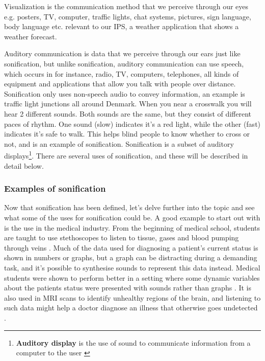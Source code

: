 Visualization is the communication method that we perceive through our eyes e.g. posters, TV, computer, traffic lights, chat systems, pictures, sign language, body language etc. relevant to our IPS, a weather application that shows a weather forecast.


Auditory communication is data that we perceive through our ears just like sonification, but unlike sonification, auditory communication can use speech, which occurs in for instance, radio, TV, computers, telephones, all kinds of equipment and applications that allow you talk with people over distance. 
Sonification only uses non-speech audio to convey information, an example is traffic light junctions all around Denmark. 
When you near a crosswalk you will hear 2 different sounds. 
Both sounds are the same, but they consist of different paces of rhythm. 
One sound (slow) indicates it’s a red light, while the other (fast) indicates it’s safe to walk. 
This helps blind people to know whether to cross or not, and is an example of sonification. 
Sonification is a subset of auditory displays\footnote{\textbf{Auditory display} is the use of sound to communicate information from a computer to the user \cite*{McGookin2004}}. 
There are several uses of sonification, and these will be described in detail below.


\subsubsection{Examples of sonification} %
\label{ssub:examples_of_sonification}
Now that sonification has been defined, let’s delve further into the topic and see what some of the uses for sonification could be. 
A good example to start out with is the use in the medical industry. 
From the beginning of medical school, students are taught to use stethoscopes to listen to tissue, gases and blood pumping through veins \cite*{Barrass1999}. 
Much of the data used for diagnosing a patient’s current status is shown in numbers or graphs, but a graph can be distracting during a demanding task, and it’s possible to synthesise sounds to represent this data instead. 
Medical students were shown to perform better in a setting where some dynamic variables about the patients status were presented with sounds rather than graphs \cite*{Barrass1999}. 
It is also used in MRI scans to identify unhealthy regions of the brain, and listening to such data might help a doctor diagnose an illness that otherwise goes undetected \cite*{Barrass1999}.


